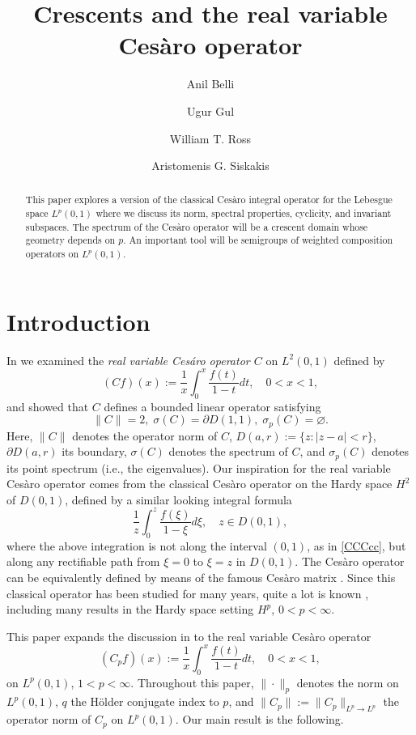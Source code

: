 \documentclass[11pt]{amsart}
\author[A. Belli]{Anil Belli}
\author[U. Gul]{Ugur Gul}
\author[W. Ross]{William T. Ross}
\author[A. Siskakis]{Aristomenis G. Siskakis}
\title{Crescents and the real variable Ces\`{a}ro operator}
\numberwithin{equation}{section}
\theoremstyle{plain}
\theoremstyle{definition}
\newcommand{\0}{{\color{lightgray}0}}
\begin{document}
\begin{abstract}
This paper explores a version of the classical Ces\`{a}ro integral operator for the Lebesgue space $L^p(0, 1)$ where we discuss its norm, spectral properties, cyclicity, and invariant subspaces. The spectrum of the Ces\`{a}ro operator will be a crescent domain whose geometry depends on $p$. An important tool will be semigroups of weighted composition operators on $L^p(0, 1)$.
\end{abstract}


\maketitle


\section{Introduction}

In \cite{CL2} we examined the {\em real variable Ces\'{a}ro operator $C$} on  $L^2(0, 1)$ defined by 
\begin{equation}\label{CCCcc}
(C f)(x) := \frac{1}{x} \int_{0}^{x} \frac{f(t)}{1 - t} dt, \quad 0 < x < 1,
\end{equation} and showed  that $C$ defines a bounded linear operator satisfying 
\begin{equation}\label{resultsp=2}
\|C\| = 2, \; \sigma(C) = \partial D(1, 1), \;  \sigma_{p}(C)  = \varnothing.
\end{equation}
Here, $\|C\|$ denotes the operator norm of $C$, $D(a, r) := \{z: |z - a| < r\} $, $\partial D(a, r)$ its boundary, $\sigma(C)$ denotes the spectrum of $C$, and $\sigma_{p}(C)$ denotes its point spectrum (i.e., the eigenvalues). Our inspiration for  the real variable Ces\`{a}ro operator comes from the classical Ces\`{a}ro operator on the Hardy space $H^2$ of $D(0, 1)$, defined by a similar looking integral formula 
$$\frac{1}{z} \int_{0}^{z} \frac{f(\xi)}{1 - \xi} d\xi, \quad z \in D(0, 1),$$
where the above integration is not along the interval  $(0, 1)$, as in \eqref{CCCcc}, but  along any rectifiable path from $\xi = 0$ to $\xi = z$ in $D(0, 1)$. The Ces\`{a}ro operator can  be equivalently defined by means of the famous Ces\`{a}ro matrix \cite{MR187085}. Since this classical operator has been studied for many years, quite a lot is known \cite{MR187085, MR5037546}, including many results in the Hardy space setting $H^p$, $0 < p < \infty$.


This paper expands the discussion in \cite{CL2} to the real variable Ces\`{a}ro operator 
$$(C_{p} f)(x) :=  \frac{1}{x} \int_{0}^{x} \frac{f(t)}{1 - t} dt, \quad 0 < x < 1,$$
on $L^p(0, 1)$, $1 < p < \infty$. Throughout this paper,  $\|\cdot\|_{p}$
denotes the norm on $L^p(0, 1)$,
$q $ the H\"{o}lder conjugate index to $p$, and  $\|C_{p}\| := \|C_{p}\|_{L^p \to L^p}$ the operator norm of $C_p$ on $L^p(0, 1)$. Our main result  is the following. 
\end{document}
